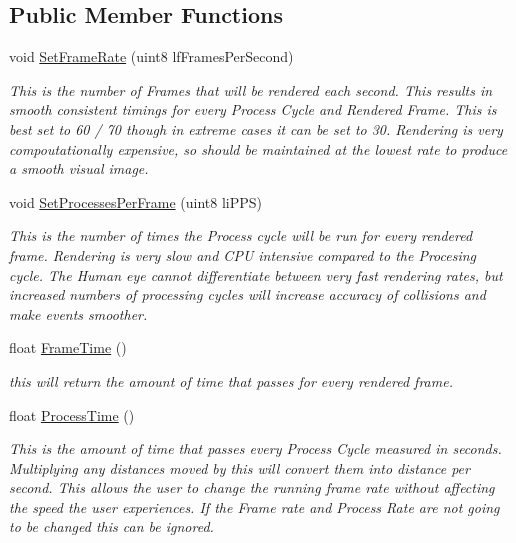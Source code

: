 \subsection*{Public Member Functions}
\begin{DoxyCompactItemize}
\item 
void \hyperlink{classc_frame_rate_a11d2578dfcb6eb2fea0bb331b7188dfe}{SetFrameRate} (uint8 lfFramesPerSecond)
\begin{DoxyCompactList}\small\item\em This is the number of Frames that will be rendered each second. This results in smooth consistent timings for every Process Cycle and Rendered Frame. This is best set to 60 / 70 though in extreme cases it can be set to 30. Rendering is very compoutationally expensive, so should be maintained at the lowest rate to produce a smooth visual image. \item\end{DoxyCompactList}\item 
void \hyperlink{classc_frame_rate_afb2bce05079fe1bc1e7b3ac3295fd692}{SetProcessesPerFrame} (uint8 liPPS)
\begin{DoxyCompactList}\small\item\em This is the number of times the Process cycle will be run for every rendered frame. Rendering is very slow and CPU intensive compared to the Procesing cycle. The Human eye cannot differentiate between very fast rendering rates, but increased numbers of processing cycles will increase accuracy of collisions and make events smoother. \item\end{DoxyCompactList}\item 
float \hyperlink{classc_frame_rate_a6af788062fd7f1cff658e19ca790219c}{FrameTime} ()
\begin{DoxyCompactList}\small\item\em this will return the amount of time that passes for every rendered frame. \item\end{DoxyCompactList}\item 
float \hyperlink{classc_frame_rate_ac314f1e240949dc74bd51730748ce1b2}{ProcessTime} ()
\begin{DoxyCompactList}\small\item\em This is the amount of time that passes every Process Cycle measured in seconds. Multiplying any distances moved by this will convert them into distance per second. This allows the user to change the running frame rate without affecting the speed the user experiences. If the Frame rate and Process Rate are not going to be changed this can be ignored. \item\end{DoxyCompactList}\item 

\end{DoxyCompactItemize}
